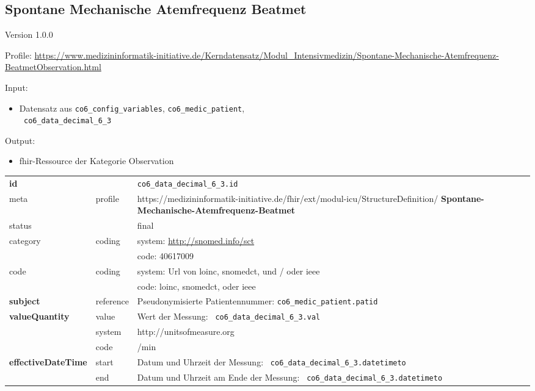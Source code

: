 \subsection{Spontane Mechanische Atemfrequenz Beatmet} 
\noindent Version 1.0.0

\noindent Profile: \url{https://www.medizininformatik-initiative.de/Kerndatensatz/Modul_Intensivmedizin/Spontane-Mechanische-Atemfrequenz-BeatmetObservation.html}

\noindent Input:
\begin{itemize}
	\item Datensatz aus \texttt{co6\_config\_variables}, \texttt{co6\_medic\_patient}, \\ \texttt{
co6\_data\_decimal\_6\_3}
\end{itemize}
Output:
\begin{itemize}
        \item \ac{fhir}-Ressource der Kategorie \glqq Observation\grqq{}
\end{itemize}
\begin{longtable}{|l|l|p{7.5cm}|}
        \hline
        \rowcolor{lightgray} \multicolumn{3}{|l|}{Data Mapping (inhaltlich)} \\ \hline
        \textbf{id} &  & \texttt{co6\_data\_decimal\_6\_3.id} \\ \hline
	meta & profile & https://medizininformatik-initiative.de/fhir/ext/modul-icu/StructureDefinition/\textbf{
Spontane-Mechanische-Atemfrequenz-Beatmet} \\ \hline 
	status &  & final   \\ \hline 
	category & coding & system: \url{http://snomed.info/sct} \\
\cline{3-3}
	& & code: 40617009 \\ \hline
	code & coding & system: Url von \ac{loinc}, \ac{snomedct}, und / oder \ac{ieee} \\ 
	\cline{3-3} 
	 &  & code: \ac{loinc}, \ac{snomedct}, oder \ac{ieee} \\ \hline
	 \textbf{subject}  & reference & Pseudonymisierte Patientennummer: \texttt{co6\_medic\_patient.patid} \\ \hline
	 \textbf{valueQuantity}  & value & Wert der Messung: \texttt{
co6\_data\_decimal\_6\_3.val} \\
        \cline{2-3}
         & system & http://unitsofmeasure.org \\
         \cline{2-3}
         & code & /min \\ \hline
     \textbf{effectiveDateTime}  & start & Datum und Uhrzeit der Messung: \texttt{
co6\_data\_decimal\_6\_3.datetimeto} \\
    \cline{2-3}
     & end & Datum und Uhrzeit am Ende der Messung: \texttt{
co6\_data\_decimal\_6\_3.datetimeto} \\ \hline
\end{longtable}


